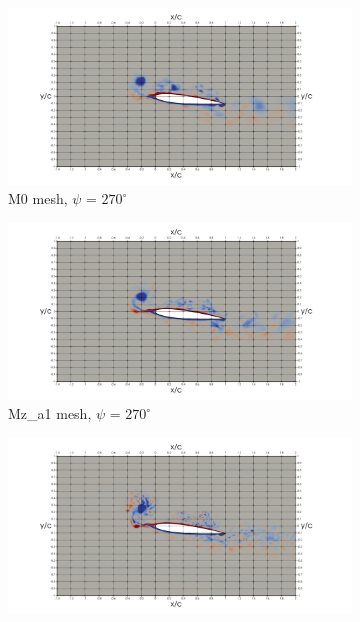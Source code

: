 \begin{figure}[H]
\centering

\begin{subfigure}[b]{0.475\textwidth}
\centering
\includegraphics[width=1.25\textwidth]{figures/vorticity_plots/M0/ph_270.png}
\caption{M0 mesh, $\psi$ = $270^\circ$}
\label{fig:M0_psi270}
\end{subfigure}
\begin{subfigure}[b]{0.475\textwidth}
\centering
\includegraphics[width=1.25\textwidth]{figures/vorticity_plots/Mza1/ph_270.png}
\caption{Mz\_a1 mesh, $\psi$ = $270^\circ$}
\label{fig:Ma1_psi270}
\end{subfigure}
\begin{subfigure}[b]{0.475\textwidth}
\centering
\includegraphics[width=1.25\textwidth]{figures/vorticity_plots/Mza2/ph_270.png}

\end{subfigure}
\end{figure}
